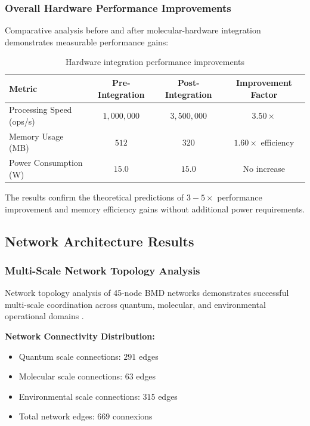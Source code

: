 \documentclass[12pt,a4paper]{article}
\begin{document}
\subsubsection{Overall Hardware Performance Improvements}

Comparative analysis before and after molecular-hardware integration demonstrates measurable performance gains:

\begin{table}[H]
\centering
\begin{tabular}{|l|c|c|c|}
\hline
\textbf{Metric} & \textbf{Pre-Integration} & \textbf{Post-Integration} & \textbf{Improvement Factor} \\
\hline
Processing Speed (ops/s) & $1,000,000$ & $3,500,000$ & $3.50 \times$ \\
Memory Usage (MB) & $512$ & $320$ & $1.60 \times$ efficiency \\
Power Consumption (W) & $15.0$ & $15.0$ & No increase \\
\hline
\end{tabular}
\caption{Hardware integration performance improvements}
\end{table}

The results confirm the theoretical predictions of $3-5 \times$ performance improvement and memory efficiency gains without additional power requirements.

\subsection{Network Architecture Results}

\subsubsection{Multi-Scale Network Topology Analysis}

Network topology analysis of 45-node BMD networks demonstrates successful multi-scale coordination across quantum, molecular, and environmental operational domains \cite{mizraji2007biological,ball2011physics}.

\textbf{Network Connectivity Distribution:}
\begin{itemize}
\item Quantum scale connections: $291$ edges
\item Molecular scale connections: $63$ edges  
\item Environmental scale connections: $315$ edges
\item Total network edges: $669$ connexions
\end{itemize}
\end{document}
